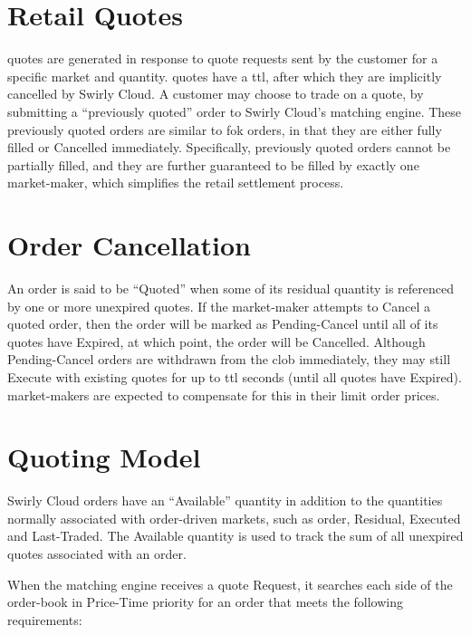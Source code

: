 \documentclass[12pt,a4paper,notitlepage,bibliography=totoc]{scrreprt}
\newcommand{\swirly}{Swirly Cloud}
\begin{document}
\section{Retail Quotes}

\Glspl{quote} are generated in response to \gls{quote} requests sent by the customer for a specific
\gls{market} and quantity. \Glspl{quote} have a \gls{ttl}, after which they are implicitly cancelled
by \swirly{}. A customer may choose to \gls{trade} on a \gls{quote}, by submitting a ``previously
quoted'' \gls{order} to \swirly{}'s \gls{matching engine}. These previously quoted \glspl{order} are
similar to \gls{fok} \glspl{order}, in that they are either fully filled or Cancelled
immediately. Specifically, previously quoted \glspl{order} cannot be partially filled, and they are
further guaranteed to be filled by exactly one \gls{market-maker}, which simplifies the retail
settlement process.

\section{Order Cancellation}

An \gls{order} is said to be ``Quoted'' when some of its residual quantity is referenced by one or
more unexpired \glspl{quote}. If the \gls{market-maker} attempts to Cancel a quoted \gls{order},
then the \gls{order} will be marked as Pending-Cancel until all of its \glspl{quote} have Expired,
at which point, the \gls{order} will be Cancelled. Although Pending-Cancel \glspl{order} are
withdrawn from the \gls{clob} immediately, they may still Execute with existing \glspl{quote} for up
to \gls{ttl} seconds (until all \glspl{quote} have Expired). \Glspl{market-maker} are expected to
compensate for this in their \gls{limit order} prices.

\section{Quoting Model}

\swirly{} \glspl{order} have an ``Available'' quantity in addition to the quantities normally
associated with \gls{order-driven} \glspl{market}, such as \gls{order}, Residual, Executed and
Last-Traded. The Available quantity is used to track the sum of all unexpired \glspl{quote}
associated with an \gls{order}.

When the \gls{matching engine} receives a \gls{quote} Request, it searches each side of the
\gls{order-book} in Price-Time priority for an \gls{order} that meets the following requirements:
\end{document}
